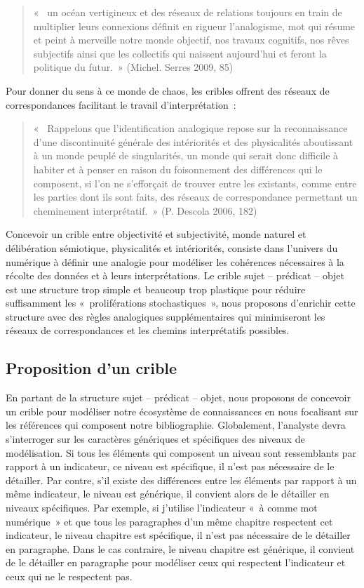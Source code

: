 \documentclass[
  letterpaper,
  DIV=11,
  numbers=noendperiod]{scrreprt}
\begin{document}
\begin{quote}
«~ un océan vertigineux et des réseaux de relations toujours en train de
multiplier leurs connexions définit en rigueur l'analogisme, mot qui
résume et peint à merveille notre monde objectif, nos travaux cognitifs,
nos rêves subjectifs ainsi que les collectifs qui naissent aujourd'hui
et feront la politique du futur.~» (Michel. Serres 2009, 85)
\end{quote}

Pour donner du sens à ce monde de chaos, les cribles offrent des réseaux
de correspondances facilitant le travail d'interprétation~:

\begin{quote}
«~ Rappelons que l'identification analogique repose sur la
reconnaissance d'une discontinuité générale des intériorités et des
physicalités aboutissant à un monde peuplé de singularités, un monde qui
serait donc difficile à habiter et à penser en raison du foisonnement
des différences qui le composent, si l'on ne s'efforçait de trouver
entre les existants, comme entre les parties dont ils sont faits, des
réseaux de correspondance permettant un cheminement interprétatif.~» (P.
Descola 2006, 182)
\end{quote}

Concevoir un crible entre objectivité et subjectivité, monde naturel et
délibération sémiotique, physicalités et intériorités, consiste dans
l'univers du numérique à définir une analogie pour modéliser les
cohérences nécessaires à la récolte des données et à leurs
interprétations. Le crible sujet -- prédicat -- objet est une structure
trop simple et beaucoup trop plastique pour réduire suffisamment les
«~proliférations stochastiques~», nous proposons d'enrichir cette
structure avec des règles analogiques supplémentaires qui minimiseront
les réseaux de correspondances et les chemins interprétatifs possibles.

\hypertarget{sec-propositionCrible}{%
\subsection{Proposition d'un crible}\label{sec-propositionCrible}}

En partant de la structure sujet -- prédicat -- objet, nous proposons de
concevoir un crible pour modéliser notre écosystème de connaissances en
nous focalisant sur les références qui composent notre bibliographie.
Globalement, l'analyste devra s'interroger sur les caractères génériques
et spécifiques des niveaux de modélisation. Si tous les éléments qui
composent un niveau sont ressemblants par rapport à un indicateur, ce
niveau est spécifique, il n'est pas nécessaire de le détailler. Par
contre, s'il existe des différences entre les éléments par rapport à un
même indicateur, le niveau est générique, il convient alors de le
détailler en niveaux spécifiques. Par exemple, si j'utilise l'indicateur
«~à comme mot numérique~» et que tous les paragraphes d'un même chapitre
respectent cet indicateur, le niveau chapitre est spécifique, il n'est
pas nécessaire de le détailler en paragraphe. Dans le cas contraire, le
niveau chapitre est générique, il convient de le détailler en paragraphe
pour modéliser ceux qui respectent l'indicateur et ceux qui ne le
respectent pas.
\end{document}
